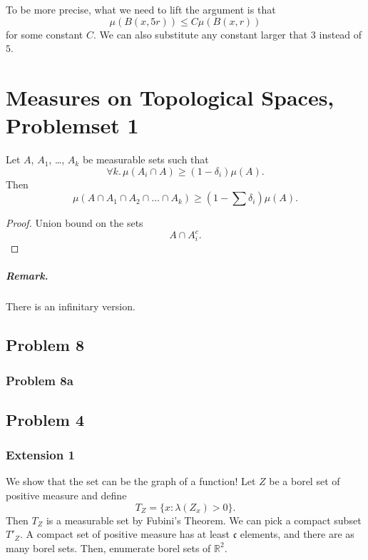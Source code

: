 To be more precise, what we need to lift the argument is that
\[ 
    \mu \left( B(x, 5r) \right) \leqslant C \mu \left( B(x,r) \right)
\]
for some constant \( C \). We can also substitute any constant larger that 3 instead of \( 5 \).

\chapter{Measures on Topological Spaces, Problemset 1}

\begin{lemma}\label{CuttingOutMeasure}
    Let \(A\), \(A_1\), \ldots, \(A_k\) be measurable sets such that
    \[
        \forall k.\, \mu(A_i \cap A) \geq (1 - \delta_i)\mu(A).
    \]
    Then
    \[
        \mu(A \cap A_1 \cap A_2 \cap \ldots \cap A_k) \geq \left(1 - \sum \delta_i \right) \mu(A).
    \]
\end{lemma}
\begin{proof}
    Union bound on the sets
    \[
        A \cap A_i^c.
    \]
\end{proof}

\paragraph{Remark.} There is an infinitary version.

\section*{Problem 8}
\subsection*{Problem 8a}

\section*{Problem 4}


\subsection*{Extension 1}
We show that the set can be the graph of a function! Let \(Z\) be a borel set of positive measure and define
\[
    T_Z = \{ x : \lambda(Z_x) > 0 \}.
\]
Then \(T_Z\) is a measurable set by Fubini's Theorem. We can pick a compact subset \( T'_Z \). A compact set of positive measure has at least \(\mathfrak{c}\) elements, and there are as many borel sets. Then, enumerate borel sets of \( \mathbb{R}^2 \).
